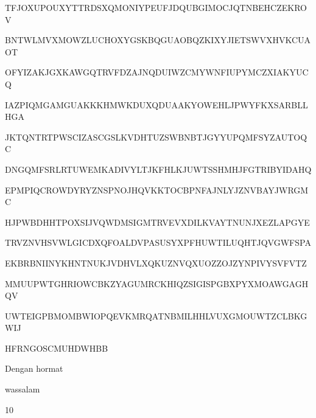 \documentclass{article}
\begin{document}

TFJOXUPOUXYTTRDSXQMONIYPEUFJDQUBGIMOCJQTNBEHCZEKROV

BNTWLMVXMOWZLUCHOXYGSKBQGUAOBQZKIXYJIETSWVXHVKCUAOT

OFYIZAKJGXKAWGQTRVFDZAJNQDUIWZCMYWNFIUPYMCZXIAKYUCQ

IAZPIQMGAMGUAKKKHMWKDUXQDUAAKYOWEHLJPWYFKXSARBLLHGA

JKTQNTRTPWSCIZASCGSLKVDHTUZSWBNBTJGYYUPQMFSYZAUTOQC

DNGQMFSRLRTUWEMKADIVYLTJKFHLKJUWTSSHMHJFGTRIBYIDAHQ

EPMPIQCROWDYRYZNSPNOJHQVKKTOCBPNFAJNLYJZNVBAYJWRGMC

HJPWBDHHTPOXSIJVQWDMSIGMTRVEVXDILKVAYTNUNJXEZLAPGYE

TRVZNVHSVWLGICDXQFOALDVPASUSYXPFHUWTILUQHTJQVGWFSPA

EKBRBNIINYKHNTNUKJVDHVLXQKUZNVQXUOZZOJZYNPIVYSVFVTZ

MMUUPWTGHRIOWCBKZYAGUMRCKHIQZSIGISPGBXPYXMOAWGAGHQV

UWTEIGPBMOMBWIOPQEVKMRQATNBMILHHLVUXGMOUWTZCLBKGWIJ

HFRNGOSCMUHDWHBB

Dengan hormat

wassalam

10
\end{document}
